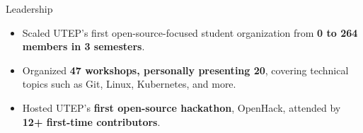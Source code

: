 \documentclass{resume} %
\begin{document}
\begin{workSection}{Leadership}
    
    \customItem[
    	title=President \& Founder - \href{https://www.instagram.com/foss.utep/}{\textbf{Free and Open Source Software Club at UTEP} \faExternalLink},
    	duration=December 2023 - March 2025
    ]
    \begin{itemize}
    	\vspace{-0.5em}
    	\itemsep -6pt {}
    	\item Scaled UTEP's first open-source-focused student organization from \textbf{0 to 264 members in 3 semesters}. %
		\item Organized \textbf{47 workshops, personally presenting 20}, covering technical topics such as Git, Linux, Kubernetes, and more.
		\item Hosted UTEP's \textbf{first open-source hackathon}, OpenHack, attended by \textbf{12+ first-time contributors}.
    \end{itemize}


\end{workSection}
\end{document}

